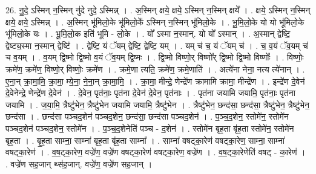 \documentclass[17pt]{extarticle}
\begin{document}
26. नु॒दे॒ ऽस्मिन् न॒स्मिन् नु॑दे नुदे॒ ऽस्मिन्न् । . अ॒स्मिन् क्षये॒ क्षये॒ ऽस्मिन् न॒स्मिन् क्षये᳚ । . क्षये॒ ऽस्मिन् न॒स्मिन् क्षये॒ क्षये॒ ऽस्मिन्न् । . अ॒स्मिन् भू॑मिलो॒के भू॑मिलो॒के᳚ ऽस्मिन् न॒स्मिन् भू॑मिलो॒के । . भू॒मि॒लो॒के यो यो भू॑मिलो॒के भू॑मिलो॒के यः । . भू॒मि॒लो॒क इति॑ भूमि - लो॒के । . यो᳚ ऽस्मा न॒स्मान्. यो यो᳚ ऽस्मान् । . अ॒स्मान् द्वेष्टि॒ द्वेष्ट्य॒स्मा न॒स्मान् द्वेष्टि॑ । . द्वेष्टि॒ यं ॅयम् द्वेष्टि॒ द्वेष्टि॒ यम् । . यम् च॑ च॒ यं ॅयम् च॑ । . च॒ व॒यं ॅव॒यम् च॑ च व॒यम् । . व॒यम् द्वि॒ष्मो द्वि॒ष्मो व॒यं ॅव॒यम् द्वि॒ष्मः । . द्वि॒ष्मो विष्णो॒र् विष्णो᳚र् द्वि॒ष्मो द्वि॒ष्मो विष्णोः᳚ । . विष्णोः॒ क्रमे॑ण॒ क्रमे॑ण॒ विष्णो॒र् विष्णोः॒ क्रमे॑ण । . क्रमे॒णा त्यति॒ क्रमे॑ण॒ क्रमे॒णाति॑ । . अत्ये॑ना नेना॒ नत्य त्ये॑नान् । . ए॒ना॒न् क्रा॒मा॒मि॒ क्रा॒मा॒ म्ये॒ना॒ ने॒ना॒न् क्रा॒मा॒मि॒ । . क्रा॒मा॒ मीन्द्रे॒ णेन्द्रे॑ण क्रामामि क्रामा॒ मीन्द्रे॑ण । . इन्द्रे॑ण दे॒वेन॑ दे॒वेनेन्द्रे॒ णेन्द्रे॑ण दे॒वेन॑ । . दे॒वेन॒ पृत॑नाः॒ पृत॑ना दे॒वेन॑ दे॒वेन॒ पृत॑नाः । . पृत॑ना जयामि जयामि॒ पृत॑नाः॒ पृत॑ना जयामि । . ज॒या॒मि॒ त्रैष्टु॑भेन॒ त्रैष्टु॑भेन जयामि जयामि॒ त्रैष्टु॑भेन । . त्रैष्टु॑भेन॒ छन्द॑सा॒ छन्द॑सा॒ त्रैष्टु॑भेन॒ त्रैष्टु॑भेन॒ छन्द॑सा । . छन्द॑सा पञ्चद॒शेन॑ पञ्चद॒शेन॒ छन्द॑सा॒ छन्द॑सा पञ्चद॒शेन॑ । . प॒ञ्च॒द॒शेन॒ स्तोमे॑न॒ स्तोमे॑न पञ्चद॒शेन॑ पञ्चद॒शेन॒ स्तोमे॑न । . प॒ञ्च॒द॒शेनेति॑ पञ्च - द॒शेन॑ । . स्तोमे॑न बृह॒ता बृ॑ह॒ता स्तोमे॑न॒ स्तोमे॑न बृह॒ता । . बृ॒ह॒ता साम्ना॒ साम्ना॑ बृह॒ता बृ॑ह॒ता साम्ना᳚ । . साम्ना॑ वषट्का॒रेण॑ वषट्का॒रेण॒ साम्ना॒ साम्ना॑ वषट्का॒रेण॑ । . व॒ष॒ट्का॒रेण॒ वज्रे॑ण॒ वज्रे॑ण वषट्का॒रेण॑ वषट्का॒रेण॒ वज्रे॑ण । . व॒ष॒ट्का॒रेणेति॑ वषट् - का॒रेण॑ । . वज्रे॑ण सह॒जान् थ्स॑ह॒जान्. वज्रे॑ण॒ वज्रे॑ण सह॒जान् । \newline
\end{document}
